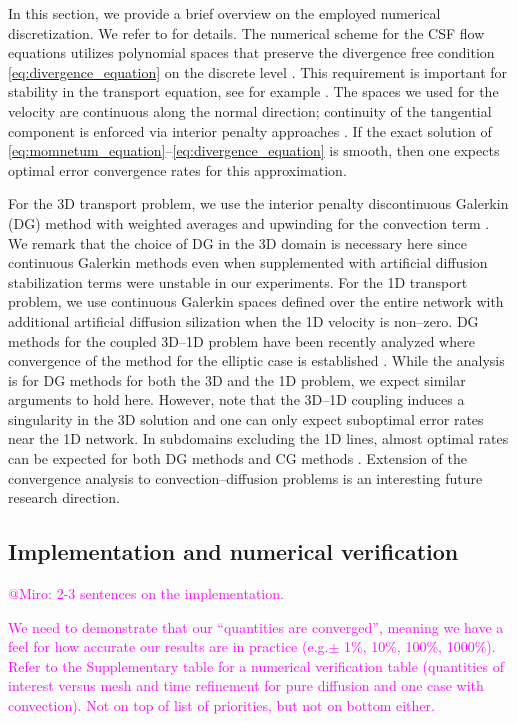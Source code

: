 \documentclass[fleqn,10pt]{wlscirep}
\newcommand{\mer}[1]{\textcolor{magenta}{#1}}
\begin{document}
In this section, we provide a brief overview on the employed numerical discretization. We refer to  for details. The numerical scheme for the CSF flow equations utilizes polynomial spaces that preserve the divergence free condition \eqref{eq:divergence_equation} on the discrete level \cite{hong2016robust}. This requirement is important for stability in the transport equation, see for example \cite{cesmelioglu2022compatible}. The spaces we used for the velocity are continuous along the normal direction; continuity of the tangential component is enforced via interior penalty approaches \cite{hong2016robust}.  If the exact solution of \eqref{eq:momnetum_equation}--\eqref{eq:divergence_equation} is smooth, then one expects optimal error convergence rates for this approximation. 

For the 3D transport problem, we use the interior penalty discontinuous Galerkin (DG) method with weighted averages and upwinding for the convection term \cite{ern2009discontinuous}.  We remark that the choice of DG in the 3D domain is necessary here since  continuous Galerkin methods even when supplemented with artificial diffusion stabilization terms were unstable in our experiments. For the 1D transport problem, we use continuous Galerkin spaces defined over the entire network with additional artificial diffusion silization when the 1D velocity is non--zero.  DG methods for the coupled 3D--1D problem have been recently analyzed  where convergence of the method for the elliptic case is established \cite{masri2024discontinuous}. While the analysis is for DG methods for both the 3D and the 1D problem, we expect similar arguments to hold here. However, note that the 3D--1D coupling induces a singularity in the 3D solution and one can only expect suboptimal error rates near the 1D network. In subdomains excluding the 1D lines, almost optimal rates can be expected for both DG methods \cite{masri2023discontinuous} and CG methods \cite{koppl2016local}.  Extension of the convergence analysis to convection--diffusion problems is an interesting future research direction. 
 

\subsection*{Implementation and numerical verification}

\mer{@Miro: 2-3 sentences on the implementation.}

\mer{We need to demonstrate that our ``quantities are converged'', meaning we have a feel for how accurate our results are in practice (e.g.$\pm$ 1\%, 10\%, 100\%, 1000\%). Refer to the Supplementary table for a numerical verification table (quantities of interest versus mesh and time refinement for pure diffusion and one case with convection). Not on top of list of priorities, but not on bottom either.} 
\end{document}
